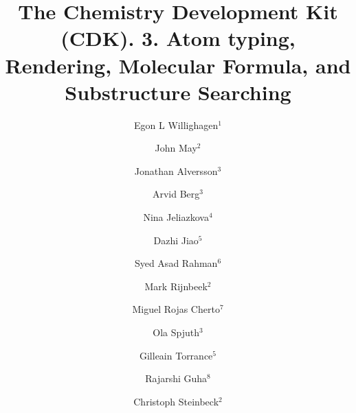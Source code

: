 \documentclass[10pt]{bmc_article}
\newenvironment{bmcformat}{\begin{raggedright}\baselineskip20pt\sloppy\setboolean{publ}{false}}{\end{raggedright}\baselineskip20pt\sloppy}
\begin{document}
\begin{bmcformat}

\title{The Chemistry Development Kit (CDK). 3. Atom typing, Rendering, Molecular Formula, and Substructure Searching}
 
\author{
  Egon L Willighagen$^{1}$%
\and
  John May$^2$%
\and
  Jonathan Alversson$^3$%
\and
  Arvid Berg$^3$%
\and
  Nina Jeliazkova$^4$%
\and
  Dazhi Jiao$^5$%
\and
  Syed Asad Rahman$^6$%
\and
  Mark Rijnbeek$^2$%
\and
  Miguel Rojas Cherto$^7$%
\and
  Ola Spjuth$^3$%
\and
  Gilleain Torrance$^5$%
\and
  Rajarshi Guha$^{8}$%
\and
  Christoph Steinbeck$^{2}$%
}
     
\address{
    \iid(1)Department of Bioinformatics - BiGCaT, Maastricht University, Maastricht, NL-6200 MD, The Netherlands \\
    \iid(2)Chemoinformatics and Metabolism team, European Bioinformatics Institute, Hinxton, UK, \\
    \iid(3)Department of Pharmaceutical Biosciences, Uppsala University, 751 24 Uppsala, Sweden \\
    \iid(4)Ideaconsult Ltd, A. Kanchev 4, Sofia 1000, Bulgaria \\
    \iid(5)Example Ltd., Glasgow, UK \\
    \iid(6)Example Ltd., Glasgow, UK \\
    \iid(7)Division of Analytical Biosciences, Leiden/Amsterdam Center for Drug Research, Leiden, The Netherlands \\
    \iid(8)NIH Center for Translational Therapeutics, 9800 Medical Center Drive, Rockville, MD 20878, USA
}

\maketitle



\end{bmcformat}
\end{document}
